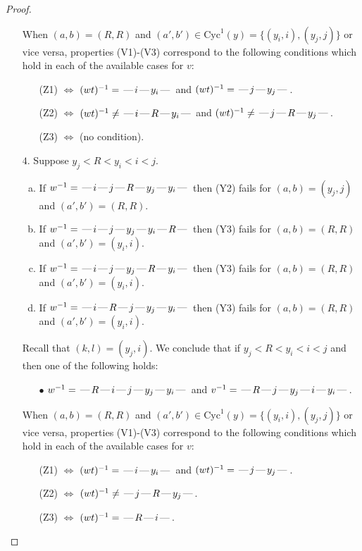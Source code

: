 \documentclass[10pt]{article}
\theoremstyle{definition}
\theoremstyle{definition}
\def\dash{\text{\hspace{0.5mm}---\hspace{0.5mm}}}
\def\Cyc{\mathrm{Cyc}}
\begin{document}
\begin{proof}
\begin{enumerate}
\begin{enumerate}
\end{enumerate}
When $(a,b)= (R, R)$ and $(a',b')\in \Cyc^1(y)=\{(y_i,i),(y_j,j)\}$ or vice versa,
properties (V1)-(V3) correspond to the following conditions which hold in
each of the available cases for $v$:
\begin{enumerate}
\item[](Z1) $\Leftrightarrow$ $(wt)^{-1} = \dash i \dash y_i \dash$  and $(wt)^{-1} = \dash j \dash y_j \dash$.
\item[](Z2) $\Leftrightarrow$ $(wt)^{-1} \neq \dash i \dash R \dash y_i \dash$  and $(wt)^{-1} \neq \dash j \dash R \dash y_j \dash$.
\item[](Z3) $\Leftrightarrow$ (no condition).
\end{enumerate}
\item[$4$.] Suppose $y_j < R < y_i < i < j$.
\begin{enumerate}[(a)]
\item If $w^{-1} = \dash i\dash j\dash R\dash y_j\dash y_i\dash $ then (Y2) fails for $(a,b)=(y_j,j)$ and $(a',b')=(R,R)$.
\item If $w^{-1} = \dash i\dash j\dash y_j\dash y_i\dash R\dash $ then (Y3) fails for $(a,b)=(R,R)$ and $(a',b')=(y_i,i)$.
\item If $w^{-1} = \dash i\dash j\dash y_j\dash R\dash y_i\dash $ then (Y3) fails for $(a,b)=(R,R)$ and $(a',b')=(y_i,i)$.
\item If $w^{-1} = \dash i\dash R\dash j\dash y_j\dash y_i\dash $ then (Y3) fails for $(a,b)=(R,R)$ and $(a',b')=(y_i,i)$.
\end{enumerate}
Recall that $(k,l) = (y_j,i)$.
We conclude that if $y_j < R < y_i < i < j$ and then one of the following holds:
\begin{enumerate}
\item[$\bullet$] $w^{-1} = \dash R\dash i\dash j\dash y_j\dash y_i\dash $ and $v^{-1} = \dash R\dash j\dash y_j\dash i\dash y_i\dash $.
\end{enumerate}
When $(a,b)= (R, R)$ and $(a',b')\in \Cyc^1(y)=\{(y_i,i),(y_j,j)\}$ or vice versa,
properties (V1)-(V3) correspond to the following conditions which hold in
each of the available cases for $v$:
\begin{enumerate}
\item[](Z1) $\Leftrightarrow$ $(wt)^{-1} = \dash i \dash y_i \dash$  and $(wt)^{-1} = \dash j \dash y_j \dash$.
\item[](Z2) $\Leftrightarrow$ $(wt)^{-1} \neq \dash j \dash R \dash y_j \dash$.
\item[](Z3) $\Leftrightarrow$ $(wt)^{-1} = \dash R \dash i \dash$.

\end{enumerate}
\end{enumerate}
\end{proof}
\end{document}
